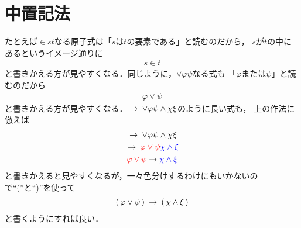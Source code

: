 \section{中置記法}
	たとえば$\in s t$なる原子式は「$s$は$t$の要素である」と読むのだから，
	$s$が$t$の中にあるというイメージ通りに
	\begin{align}
		s \in t
	\end{align}
	と書きかえる方が見やすくなる．同じように，$\vee \varphi \psi$なる式も
	「$\varphi$または$\psi$」と読むのだから
	\begin{align}
		\varphi \vee \psi
	\end{align}
	と書きかえる方が見やすくなる．$\hspace{0.25em}\rightarrow\hspace{0.25em} \vee \varphi \psi \wedge \chi \xi$のように長い式も，
	上の作法に倣えば
	\begin{align}
		\begin{gathered}
			\hspace{0.25em}\rightarrow\hspace{0.25em} \vee \varphi \psi \wedge \chi \xi \\
			\hspace{0.25em}\rightarrow\hspace{0.25em} \color{red}{\varphi \vee \psi} \color{blue}{\chi \wedge \xi} \\
			\color{red}{\varphi \vee \psi} \color{black}{\hspace{0.25em}\rightarrow\hspace{0.25em}} \color{blue}{\chi \wedge \xi}
		\end{gathered}
	\end{align}
	と書きかえると見やすくなるが，一々色分けするわけにもいかないので``(''と``)''を使って
	\begin{align}
		(\, \varphi \vee \psi\, ) \hspace{0.25em}\rightarrow\hspace{0.25em} (\, \chi \wedge \xi\, )
	\end{align}
	と書くようにすれば良い．
	
